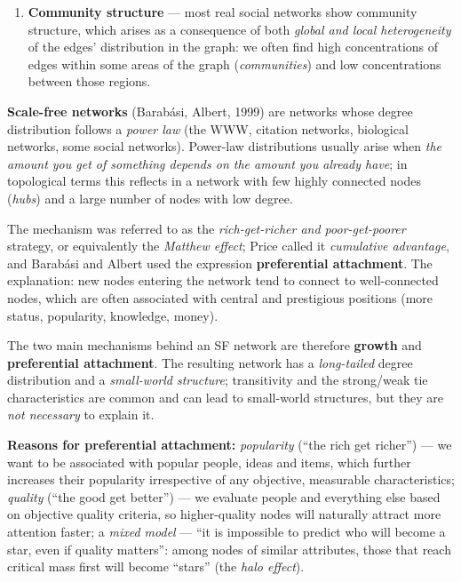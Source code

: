 \documentclass[11pt,a4paper]{article}
\theoremstyle{definition}
\providecommand{\uv}[1]{``#1''}
\begin{document}
\begin{defbox}
\begin{enumerate}
      observe a certain \emph{selectivity} in the establishment of connections. Selective linking is
      called \emph{assortative mixing}, or homophily; a classic example is mixing by race. Real
      networks show higher tendencies for assortative mixing.
\item \textbf{Community structure} --- most real social networks show community structure, which
      arises as a consequence of both \emph{global and local heterogeneity} of the edges'
      distribution in the graph: we often find high concentrations of edges within some areas of the
      graph (\emph{communities}) and low concentrations between those regions.
\end{enumerate}
\end{defbox}

\begin{defbox}
\textbf{Scale-free networks} (Barabási, Albert, 1999) are networks whose degree distribution follows
a \emph{power law} (the WWW, citation networks, biological networks, some social networks). Power-law
distributions usually arise when \emph{the amount you get of something depends on the amount you
already have}; in topological terms this reflects in a network with few highly connected nodes
(\emph{hubs}) and a large number of nodes with low degree.

The mechanism was referred to as the \emph{rich-get-richer and poor-get-poorer} strategy, or
equivalently the \emph{Matthew effect}; Price called it \emph{cumulative advantage}, and Barabási and
Albert used the expression \textbf{preferential attachment}. The explanation: new nodes entering the
network tend to connect to well-connected nodes, which are often associated with central and
prestigious positions (more status, popularity, knowledge, money).

The two main mechanisms behind an SF network are therefore \textbf{growth} and \textbf{preferential
attachment}. The resulting network has a \emph{long-tailed} degree distribution and a
\emph{small-world structure}; transitivity and the strong/weak tie characteristics are common and can
lead to small-world structures, but they are \emph{not necessary} to explain it.

\textbf{Reasons for preferential attachment:} \emph{popularity} (\uv{the rich get richer}) --- we
want to be associated with popular people, ideas and items, which further increases their popularity
irrespective of any objective, measurable characteristics; \emph{quality} (\uv{the good get better})
--- we evaluate people and everything else based on objective quality criteria, so higher-quality
nodes will naturally attract more attention faster; a \emph{mixed model} --- \uv{it is impossible to
predict who will become a star, even if quality matters}: among nodes of similar attributes, those
that reach critical mass first will become \uv{stars} (the \emph{halo effect}).
\end{defbox}
\end{document}
